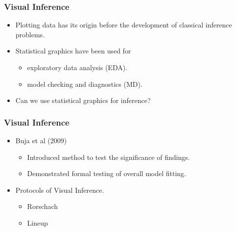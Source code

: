 \documentclass{beamer}
\begin{document}
%  



\begin{frame}
  \frametitle{Visual Inference}
		  \begin{itemize}
		  	\item Plotting data has its origin before the development of classical inference problems.
			  \item Statistical graphics have been used for
			     \begin{itemize}
			        \item exploratory data analysis (EDA).
			        \item model checking and diagnostics (MD).
           \end{itemize}				  
			  \item Can we use statistical graphics for inference?
		  \end{itemize}			
\end{frame}


\begin{frame}
\frametitle{Visual Inference}
  \begin{itemize}
    \item Buja et al (2009)
		  \begin{itemize}
			  \item Introduced method to test the significance of findings.
			  \item Demonstrated formal testing of overall model fitting.
		  \end{itemize}
		\item Protocols of Visual Inference.
		  \begin{itemize}
			  \item Rorschach
			  \item Lineup
		  \end{itemize}		
  \end{itemize}		  
\end{frame}
\end{document}
